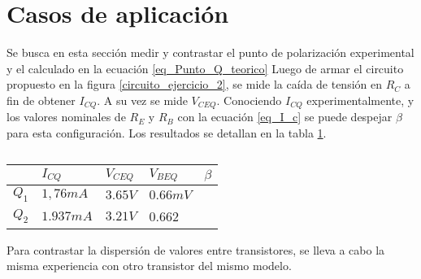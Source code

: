 \section{Casos de aplicación}

Se busca en esta sección medir y contrastar el punto de polarización experimental y el calculado en la ecuación \ref{eq_Punto_Q_teorico}
Luego de armar el circuito propuesto en la figura \ref{circuito_ejercicio_2}, se mide la caída de tensión en $R_C$ a fin de obtener $I_{CQ}$. A su vez se mide $V_{CEQ}$.
Conociendo $I_{CQ}$ experimentalmente, y los valores nominales de $R_E$ y $R_B$ con la ecuación \ref{eq_I_c} se puede despejar $\beta$ para esta configuración.
Los resultados se detallan en la tabla \ref{tabla_resultados_polarizacion}.

\begin{table}[ht]
    \centering
    \begin{tabular}{|l|l|l|l|l|}
    \hline
          & $I_{CQ}$  & $V_{CEQ}$ & $V_{BEQ}$ & $\beta$ \\ \hline
    $Q_1$ & $1,76mA$  & $3.65V$   & $0.66mV$  &         \\ \hline
    $Q_2$ & $1.937mA$ & $3.21V$   & 0.662     &         \\ \hline
    \end{tabular}
    \caption{}\label{tabla_resultados_polarizacion}
\end{table}
Para contrastar la dispersión de valores entre transistores, se lleva a cabo la misma experiencia con otro transistor del mismo modelo.